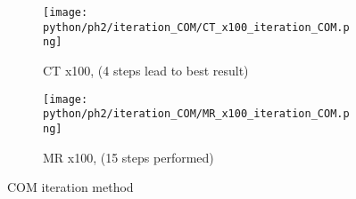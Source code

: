 \begin{figure}[!thb]
  \begin{subfigure}[b]{1\textwidth}
    \texttt{[image: python/ph2/iteration\_COM/CT\_x100\_iteration\_COM.png]}
    \caption{CT x100, (4 steps lead to best result)}
    \label{fig:CT_x100_iteration}
  \end{subfigure}
  \begin{subfigure}[b]{1\textwidth}
    \texttt{[image: python/ph2/iteration\_COM/MR\_x100\_iteration\_COM.png]}
     \caption{MR x100, (15 steps performed)}
     \label{fig:MR_x100_iteration}
  \end{subfigure}
  \caption{COM iteration method}
  \label{fig:COM_iteration}
\end{figure}

